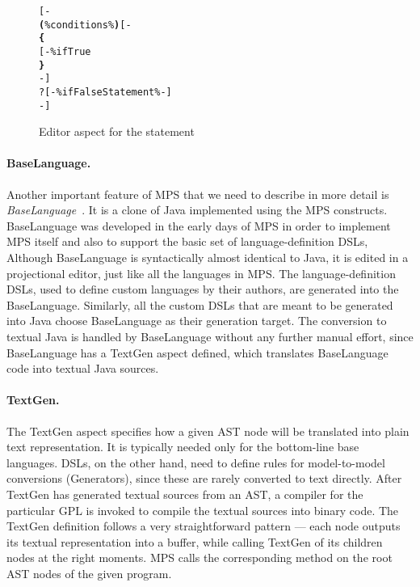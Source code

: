 \begin{figure}[ht]
\centering
\begin{alltt}
\small
{}  
    [-
       \textbf{(} \% conditions \% \textbf{)} [-
      \textbf{\{}
      [- \% ifTrue % -]
      \textbf{\}}
    -]
    ?[-  \% ifFalseStatement \% -]
    -]
\end{alltt}
\caption{Editor aspect for the  statement}
\label{fig:if_editor_definition}
\end{figure}

\paragraph{BaseLanguage.}
Another important feature of MPS that we need to describe in more detail is \emph{BaseLanguage}~\cite{ref:BaseLanguage}.
It is a clone of Java implemented using the MPS constructs.
BaseLanguage was developed in the early days of MPS in order to implement MPS itself and also to support the basic set of language-definition DSLs,
Although BaseLanguage is syntactically almost identical to Java, it is edited in a projectional editor, just like all the languages in MPS.
The language-definition DSLs, used to define custom languages by their authors, are generated into the BaseLanguage.
Similarly, all the custom DSLs that are meant to be generated into Java choose BaseLanguage as their generation target.
The conversion to textual Java is handled by BaseLanguage without any further manual effort, since BaseLanguage has a TextGen aspect defined, which translates BaseLanguage code into textual Java sources.

\paragraph{TextGen.}
The TextGen aspect specifies how a given AST node will be translated into plain text representation.
It is typically needed only for the bottom-line base languages.
DSLs, on the other hand, need to define rules for model-to-model conversions (Generators), since these are rarely converted to text directly.
After TextGen has generated textual sources from an AST, a compiler for the particular GPL is invoked to compile the textual sources into binary code.
The TextGen definition follows a very straightforward pattern --- each node outputs its textual representation into a buffer, while calling TextGen of its children nodes at the right moments.
MPS calls the corresponding method on the root AST nodes of the given program.


